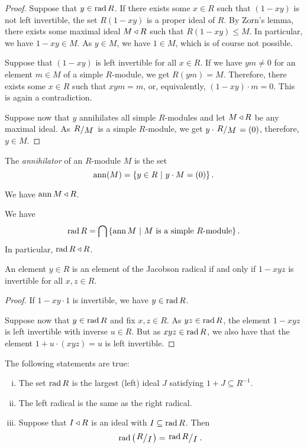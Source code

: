 \begin{proof}
Suppose that $y \in \operatorname{rad} R$. If there exists some $x \in R$ such
that $(1 - xy)$ is not left invertible, the set $R (1 - xy)$ is a
proper ideal of $R$. By Zorn's lemma, there exists some maximal
ideal $M \triangleleft R$ such that $R (1 - xy) \leq M$. In particular, we
have $1 - xy \in M$. As $y \in M$, we have $1 \in M$, which is of
course not possible.

Suppose that $(1 - xy)$ is left invertible for all $x \in R$. If
we have $ym \ne 0$ for an element $m \in M$ of a simple $R$-module,
we get $R(ym) = M$. Therefore, there exists some $x \in R$ such
that $xym = m$, or, equivalently, $(1 - xy) \cdot m = 0$. This is
again a contradiction.

Suppose now that $y$ annihilates all simple $R$-modules and let
$M \triangleleft R$ be any maximal ideal. As $\kvoc{R}{M}$ is a simple
$R$-module, we get $y \cdot \kvoc{R}{M} = (0)$, therefore,
$y \in M$.
\end{proof}

\begin{definicija}
The \emph{annihilator} of an $R$-module $M$ is
the set
\[
\operatorname{ann}(M) = \left\{y \in R~\middle\vert~y \cdot M = (0)\right\}.
\]
\end{definicija}

\begin{opomba}
We have $\operatorname{ann} M \triangleleft R$.
\end{opomba}

\begin{posledica}
We have
\[
\operatorname{rad} R = \bigcap \left\{\operatorname{ann} M~\middle\vert~\text{$M$ is a simple $R$-module}\right\}.
\]
In particular, $\operatorname{rad} R \triangleleft R$.
\end{posledica}

\begin{lema}
An element $y \in R$ is an element of the Jacobson radical if and
only if $1 - xyz$ is invertible for all $x, z \in R$.
\end{lema}

\begin{proof}
If $1 - xy \cdot 1$ is invertible, we have $y \in \operatorname{rad} R$.

Suppose now that $y \in \operatorname{rad} R$ and fix $x, z \in R$. As
$yz \in \operatorname{rad} R$, the element $1 - xyz$ is left invertible with
inverse $u \in R$. But as $xyz \in \operatorname{rad} R$, we also have that the
element $1 + u \cdot (xyz) = u$ is left invertible.
\end{proof}

\begin{trditev}
The following statements are true:

\begin{enumerate}[i)]
\item The set $\operatorname{rad} R$ is the largest (left) ideal $J$ satisfying
$1 + J \subseteq R^{-1}$.
\item The left radical is the same as the right radical.
\item Suppose that $I \triangleleft R$ is an ideal with
$I \subseteq \operatorname{rad} R$. Then
\[
\rad \br{\kvoc{R}{I}} = \kvoc{\rad R}{I}.
\]
\end{enumerate}
\end{trditev}

